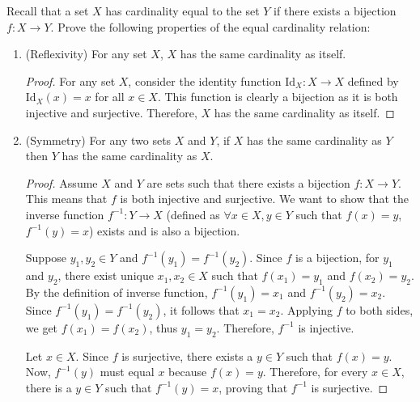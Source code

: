 \documentclass[10pt]{article}
\newenvironment{problem}[2][Problem]{\begin{trivlist}
\item[\hskip \labelsep {\bfseries #1}\hskip \labelsep {\bfseries #2.}]}{\end{trivlist}}
\begin{document}
\newpage

\begin{problem}{5}
	Recall that a set $ X $ has cardinality equal to the set $ Y $ if there exists a bijection $ f: X \to Y $. Prove the following properties of the equal cardinality relation:
	\begin{enumerate}
		\item (Reflexivity) For any set $ X $, $ X $ has the same cardinality as itself.
            \begin{proof}
                For any set \( X \), consider the identity function \( \text{Id}_X: X \to X \) defined by \( \text{Id}_X(x) = x \) for all \( x \in X \). This function is clearly a bijection as it is both injective and surjective. Therefore, \( X \) has the same cardinality as itself.
            \end{proof}
		\item (Symmetry) For any two sets $ X $ and $ Y $, if $ X $ has the same cardinality as $ Y $ then $ Y $ has the same cardinality as $ X $.
            \begin{proof}
                Assume \( X \) and \( Y \) are sets such that there exists a bijection \( f: X \to Y \). This means that \( f \) is both injective and surjective. We want to show that the inverse function \( f^{-1}: Y \to X \) (defined as $\forall x \in X, y \in Y$ such that $f(x) = y$, $f^{-1}(y) = x$) exists and is also a bijection.

                Suppose \( y_1, y_2 \in Y \) and \( f^{-1}(y_1) = f^{-1}(y_2) \). Since \( f \) is a bijection, for \( y_1 \) and \( y_2 \), there exist unique \( x_1, x_2 \in X \) such that \( f(x_1) = y_1 \) and \( f(x_2) = y_2 \). By the definition of inverse function, \( f^{-1}(y_1) = x_1 \) and \( f^{-1}(y_2) = x_2 \). Since \( f^{-1}(y_1) = f^{-1}(y_2) \), it follows that \( x_1 = x_2 \). Applying \( f \) to both sides, we get \( f(x_1) = f(x_2) \), thus \( y_1 = y_2 \). Therefore, \( f^{-1} \) is injective.

                Let \( x \in X \). Since \( f \) is surjective, there exists a \( y \in Y \) such that \( f(x) = y \). Now, \( f^{-1}(y) \) must equal \( x \) because \( f(x) = y \). Therefore, for every \( x \in X \), there is a \( y \in Y \) such that \( f^{-1}(y) = x \), proving that \( f^{-1} \) is surjective.


\end{proof}
\end{enumerate}
\end{problem}
\end{document}
